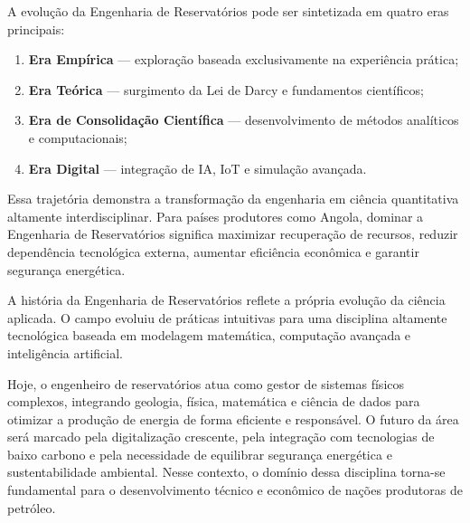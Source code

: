 \documentclass[12pt,a4paper,oneside,brazilian,sumario=tradicional]{abntex2}
\begin{document}
A evolução da Engenharia de Reservatórios pode ser sintetizada em quatro eras principais:

\begin{enumerate}
  \item \textbf{Era Empírica} — exploração baseada exclusivamente na experiência prática;
  \item \textbf{Era Teórica} — surgimento da Lei de Darcy e fundamentos científicos;
  \item \textbf{Era de Consolidação Científica} — desenvolvimento de métodos analíticos e computacionais;
  \item \textbf{Era Digital} — integração de IA, IoT e simulação avançada.
\end{enumerate}

Essa trajetória demonstra a transformação da engenharia em ciência quantitativa altamente interdisciplinar. Para países produtores como Angola, dominar a Engenharia de Reservatórios significa maximizar recuperação de recursos, reduzir dependência tecnológica externa, aumentar eficiência econômica e garantir segurança energética.

A história da Engenharia de Reservatórios reflete a própria evolução da ciência aplicada. O campo evoluiu de práticas intuitivas para uma disciplina altamente tecnológica baseada em modelagem matemática, computação avançada e inteligência artificial.

Hoje, o engenheiro de reservatórios atua como gestor de sistemas físicos complexos, integrando geologia, física, matemática e ciência de dados para otimizar a produção de energia de forma eficiente e responsável. O futuro da área será marcado pela digitalização crescente, pela integração com tecnologias de baixo carbono e pela necessidade de equilibrar segurança energética e sustentabilidade ambiental. Nesse contexto, o domínio dessa disciplina torna-se fundamental para o desenvolvimento técnico e econômico de nações produtoras de petróleo.

\cleardoublepage
\printbibliography[title={Referências}]
\end{document}
